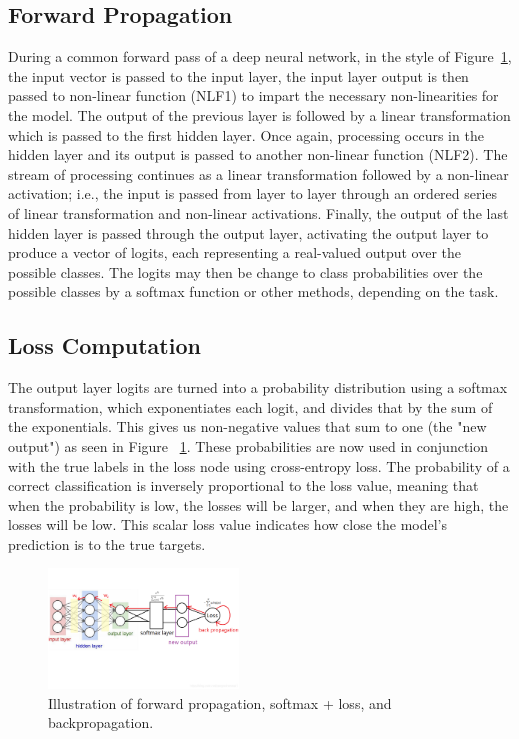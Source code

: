     
    
    \subsection{Forward Propagation}
    During a common forward pass of a deep neural network, in the style of Figure~\ref{fig:forward-loss-backprop}, the input vector is passed to the input layer, the input layer output is then passed to non-linear function (NLF1) to impart the necessary non-linearities for the model. The output of the previous layer is followed by a linear transformation which is passed to the first hidden layer. Once again, processing occurs in the hidden layer and its output is passed to another non-linear function (NLF2). The stream of processing continues as a linear transformation followed by a non-linear activation; i.e., the input is passed from layer to layer through an ordered series of linear transformation and non-linear activations. Finally, the output of the last hidden layer is passed through the output layer, activating the output layer to produce a vector of logits, each representing a real-valued output over the possible classes. The logits may then be change to class probabilities over the possible classes by a softmax function or other methods, depending on the task.
    
    \subsection{Loss Computation}
    The output layer logits are turned into a probability distribution using a softmax transformation, which exponentiates each logit, and divides that by the sum of the exponentials. This gives us non-negative values that sum to one (the "new output") as seen in Figure ~\ref{fig:forward-loss-backprop}. These probabilities are now used in conjunction with the true labels in the loss node using cross-entropy loss. The probability of a correct classification is inversely proportional to the loss value, meaning that when the probability is low, the losses will be larger, and when they are high, the losses will be low. This scalar loss value indicates how close the model's prediction is to the true targets.

    \begin{figure}[H]
      \centering
      \includegraphics[width=0.45\textwidth]{images/forward&backward_propagation.png}
      \caption{Illustration of forward propagation, softmax + loss, and backpropagation.}
      \label{fig:forward-loss-backprop}
    \end{figure}
    
